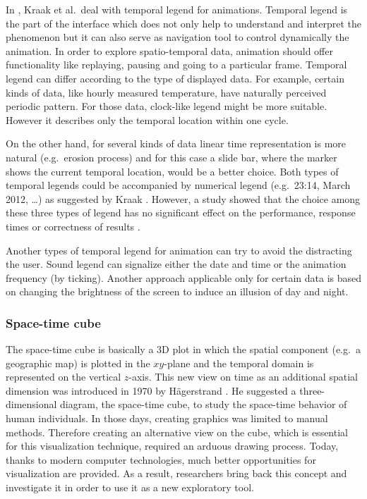 \documentclass[a4paper,12pt]{book}
\begin{document}

In \cite{kraak1997cartographic}, Kraak et al.\ deal with temporal legend for animations.
Temporal legend is the part of the interface which does not only help to understand and interpret
the phenomenon but it can also serve as navigation tool to control dynamically the animation.
In order to explore spatio-temporal data, animation should offer functionality like replaying, pausing
and going to a particular frame.
Temporal legend can differ according to the type of displayed data.
For example, certain kinds of data, like hourly measured temperature, have naturally perceived periodic pattern.
For those data, clock-like legend might be more suitable.
However it describes only the temporal location within one cycle.

On the other hand, for several kinds of data linear time representation is more natural (e.g.\ erosion process)
and for this case a slide bar, where the marker shows the current temporal location, would be a better choice.
Both types of temporal legends could be accompanied by numerical legend (e.g.\ 23:14,  March 2012, \ldots)
as suggested by Kraak \cite{kraak1997cartographic}.
However, a study showed that the choice among these three types of legend has no significant effect on
the performance, response times or correctness of results \cite{edsall1997assessing}.

Another types of temporal legend for animation can try to avoid the distracting the user.
Sound legend can signalize either the date and time or the animation frequency (by ticking).
Another approach applicable only for certain data is based on changing the brightness of the screen
to induce an illusion of day and night.


\subsubsection{Space-time cube}
The space-time cube is basically a 3D plot in which the spatial component (e.g.\ a geographic map)
is plotted in the $xy$\nobreakdash-plane and the temporal domain is represented
on the vertical $z$-axis.
This new view on time as an additional spatial dimension was introduced in 1970 by Hägerstrand \cite{hagerstrand1970}.
He suggested a three-dimensional diagram, the space-time cube, to study the space-time behavior of human individuals.
In those days, creating graphics was limited to manual methods.
Therefore creating an alternative view on the cube, which is essential for this visualization technique,
required an arduous drawing process. Today, thanks to modern computer technologies, much better opportunities
for visualization are provided. As a result, researchers bring back this concept and
investigate it in order to use it as a new exploratory tool.
\end{document}
